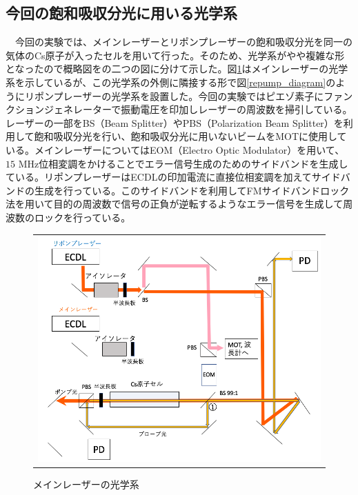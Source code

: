\documentclass[uplatex, dvipdfmx, a4paper, report, papersize, 11pt]{jsbook}
\begin{document}
\subsection{今回の飽和吸収分光に用いる光学系}
　今回の実験では、メインレーザーとリポンプレーザーの飽和吸収分光を同一の気体のCs原子が入ったセルを用いて行った。そのため、光学系がやや複雑な形となったので概略図をの二つの図に分けて示した。図\ref{Main_Laser_diagram}はメインレーザーの光学系を示しているが、この光学系の外側に隣接する形で図\ref{repump_diagram}のようにリポンプレーザーの光学系を設置した。今回の実験ではピエゾ素子にファンクションジェネレーターで振動電圧を印加しレーザーの周波数を掃引している。レーザーの一部をBS（Beam Splitter）やPBS（Polarization Beam Splitter）を利用して飽和吸収分光を行い、飽和吸収分光に用いないビームをMOTに使用している。メインレーザーについてはEOM（Electro Optic Modulator）を用いて、$15$ MHz位相変調をかけることでエラー信号生成のためのサイドバンドを生成している。リポンプレーザーはECDLの印加電流に直接位相変調を加えてサイドバンドの生成を行っている。このサイドバンドを利用してFMサイドバンドロック法を用いて目的の周波数で信号の正負が逆転するようなエラー信号を生成して周波数のロックを行っている。
\begin{figure}[H]
  \centering
    \begin{tabular}{c}
      \begin{minipage}{1\hsize}
        \centering
          \includegraphics[keepaspectratio,  scale=0.35,  angle=0]
                          {figures/saturated-absorption/Main_Laser_diagram.png}
                          \caption{メインレーザーの光学系}
                          \label{Main_Laser_diagram}
      \end{minipage}
    \end{tabular}
\end{figure}
\end{document}
